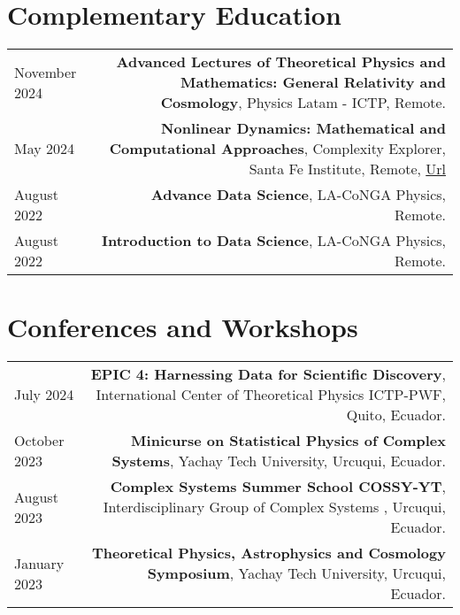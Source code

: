 \documentclass{article}
\begin{document}
\section*{Complementary Education}
\begin{tabular}{L!{\vrule}R}
	
	November 2024 & \textbf{Advanced Lectures of Theoretical Physics and Mathematics: General Relativity and Cosmology}, Physics Latam - ICTP, Remote. \\ 

    May 2024 & \textbf{Nonlinear Dynamics: Mathematical and Computational Approaches}, Complexity Explorer, Santa Fe Institute, Remote, \href{https://www.complexityexplorer.org/courses/184-nonlinear-dynamics-mathematical-and-computational-approaches/certificates/3966304258}{Url}\\

    August 2022 & \textbf{Advance Data Science}, LA-CoNGA Physics, Remote. \\

    August 2022 & \textbf{Introduction to Data Science}, LA-CoNGA Physics, Remote. \\


\end{tabular}

\section*{Conferences and Workshops}
\begin{tabular}{L!{\vrule}R}

    July 2024 & \textbf{EPIC 4: Harnessing Data for Scientific Discovery}, International Center of Theoretical Physics ICTP-PWF, Quito, Ecuador.\\
    
    October 2023 & \textbf{Minicurse on Statistical Physics of Complex Systems}, Yachay Tech University, Urcuqui, Ecuador. \\

    August 2023 & \textbf{Complex Systems Summer School COSSY-YT}, Interdisciplinary Group of Complex Systems , Urcuqui, Ecuador. \\

    January 2023 & \textbf{Theoretical Physics, Astrophysics and Cosmology Symposium}, Yachay Tech University, Urcuqui, Ecuador. \\



\end{tabular}
\end{document}
